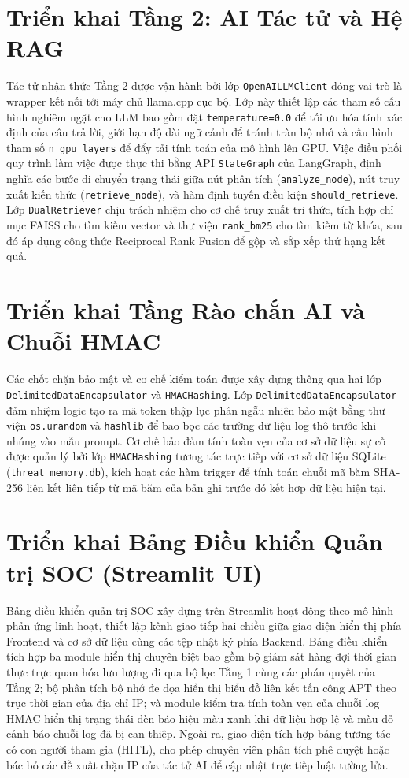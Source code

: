 \section{Triển khai Tầng 2: AI Tác tử và Hệ RAG}
Tác tử nhận thức Tầng 2 được vận hành bởi lớp \texttt{OpenAILLMClient} đóng vai trò là wrapper kết nối tới máy chủ llama.cpp cục bộ. Lớp này thiết lập các tham số cấu hình nghiêm ngặt cho LLM bao gồm đặt \texttt{temperature=0.0} để tối ưu hóa tính xác định của câu trả lời, giới hạn độ dài ngữ cảnh để tránh tràn bộ nhớ và cấu hình tham số \texttt{n\_gpu\_layers} để đẩy tải tính toán của mô hình lên GPU. Việc điều phối quy trình làm việc được thực thi bằng API \texttt{StateGraph} của LangGraph, định nghĩa các bước di chuyển trạng thái giữa nút phân tích (\texttt{analyze\_node}), nút truy xuất kiến thức (\texttt{retrieve\_node}), và hàm định tuyến điều kiện \texttt{should\_retrieve}. Lớp \texttt{DualRetriever} chịu trách nhiệm cho cơ chế truy xuất tri thức, tích hợp chỉ mục FAISS cho tìm kiếm vector và thư viện \texttt{rank\_bm25} cho tìm kiếm từ khóa, sau đó áp dụng công thức Reciprocal Rank Fusion để gộp và sắp xếp thứ hạng kết quả.

\section{Triển khai Tầng Rào chắn AI và Chuỗi HMAC}
Các chốt chặn bảo mật và cơ chế kiểm toán được xây dựng thông qua hai lớp \texttt{DelimitedDataEncapsulator} và \texttt{HMACHashing}. Lớp \texttt{DelimitedDataEncapsulator} đảm nhiệm logic tạo ra mã token thập lục phân ngẫu nhiên bảo mật bằng thư viện \texttt{os.urandom} và \texttt{hashlib} để bao bọc các trường dữ liệu log thô trước khi nhúng vào mẫu prompt. Cơ chế bảo đảm tính toàn vẹn của cơ sở dữ liệu sự cố được quản lý bởi lớp \texttt{HMACHashing} tương tác trực tiếp với cơ sở dữ liệu SQLite (\texttt{threat\_memory.db}), kích hoạt các hàm trigger để tính toán chuỗi mã băm SHA-256 liên kết liên tiếp từ mã băm của bản ghi trước đó kết hợp dữ liệu hiện tại.

\section{Triển khai Bảng Điều khiển Quản trị SOC (Streamlit UI)}
Bảng điều khiển quản trị SOC xây dựng trên Streamlit hoạt động theo mô hình phản ứng linh hoạt, thiết lập kênh giao tiếp hai chiều giữa giao diện hiển thị phía Frontend và cơ sở dữ liệu cùng các tệp nhật ký phía Backend. Bảng điều khiển tích hợp ba module hiển thị chuyên biệt bao gồm bộ giám sát hàng đợi thời gian thực trực quan hóa lưu lượng đi qua bộ lọc Tầng 1 cùng các phán quyết của Tầng 2; bộ phân tích bộ nhớ đe dọa hiển thị biểu đồ liên kết tấn công APT theo trục thời gian của địa chỉ IP; và module kiểm tra tính toàn vẹn của chuỗi log HMAC hiển thị trạng thái đèn báo hiệu màu xanh khi dữ liệu hợp lệ và màu đỏ cảnh báo chuỗi log đã bị can thiệp. Ngoài ra, giao diện tích hợp bảng tương tác có con người tham gia (HITL), cho phép chuyên viên phân tích phê duyệt hoặc bác bỏ các đề xuất chặn IP của tác tử AI để cập nhật trực tiếp luật tường lửa.

